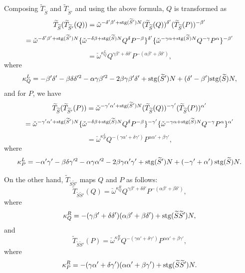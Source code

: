 \documentclass[12pt]{iopart}
\begin{document}
Composing \(\widetilde T_{\widetilde S}\) and \(\widetilde T_{\widetilde S'}\) and using the above formula,
\(Q\) is transformed as
\[
\widetilde T_{\widetilde S}(\widetilde T_{\widetilde S'}(Q))
=\check\omega^{-\delta'\beta'+{\rm stg}(\widetilde S')N}(\widetilde T_{\widetilde S}(Q))^{\delta'}(\widetilde T_{\widetilde S}(P))^{-\beta'}
\]
\[
=\check\omega^{-\delta'\beta'+{\rm stg}(\widetilde S')N}
\{\check\omega^{-\delta\beta+{\rm stg}(\widetilde S)N}
                        Q^\delta P^{-\beta}\}^{\delta'}
\{\check\omega^{-\gamma\alpha+{\rm stg}(\widetilde S)N}
                        Q^{-\gamma}P^\alpha\}^{-\beta'}
\]
\begin{equation}
=
\check\omega^{\kappa^L_Q}Q^{\gamma\beta'+\delta\delta'}P^{-(\alpha\beta'+\beta\delta')},
\end{equation}
where
\begin{equation}
\kappa^L_Q
=-\beta'\delta'-\beta\delta\delta'^2-\alpha\gamma\beta'^2-2\beta\gamma\beta'\delta'
+{\rm stg}(\widetilde S')N
+(\delta'-\beta'){\rm stg}(\widetilde S)N,
\end{equation}
and for \(P\), we have
\[
\widetilde T_{\widetilde S}(\widetilde T_{\widetilde S'}(P))
=\check\omega^{-\gamma'\alpha'+{\rm stg}(\widetilde S')N}(\widetilde T_{\widetilde S}(Q))^{-\gamma'}(\widetilde T_{\widetilde S}(P))^{\alpha'}
\]
\[
=\check\omega^{-\gamma'\alpha'+{\rm stg}(\widetilde S')N}
\{\check\omega^{-\delta\beta+{\rm stg}(\widetilde S)N}
                        Q^\delta P^{-\beta}\}^{-\gamma'}
\{
\check\omega^{-\gamma\alpha+{\rm stg}(\widetilde S)N}
                        Q^{-\gamma}P^\alpha\}^{\alpha'}
\]
\begin{equation}
=
\check\omega^{\kappa^L_P}Q^{-(\gamma\alpha'+\delta\gamma')}P^{\alpha\alpha'+\beta\gamma'},
\end{equation}
where
\begin{equation}
\kappa^L_P
=-\alpha'\gamma'-\beta\delta\gamma'^2-\alpha\gamma\alpha'^2-2\beta\gamma\alpha'\gamma'
+{\rm stg}(\widetilde S')N
+(-\gamma'+\alpha')\:{\rm stg}(\widetilde S)N.
\end{equation}

On the other hand,
\(\widetilde T_{\widetilde S\widetilde S'}\) maps \(Q\) and \(P\) as follows:
\begin{equation}
\widetilde T_{\widetilde S\widetilde S'}(Q)
=
\check\omega^{\kappa^R_Q}Q^{\gamma\beta'+\delta\delta'}P^{-(\alpha\beta'+\beta\delta')},
\end{equation}
where
\begin{equation}
\kappa^R_Q=-(\gamma\beta'+\delta\delta')(\alpha\beta'+\beta\delta')+{\rm stg}(\widetilde S\widetilde S')N,
\end{equation}
and
\begin{equation}
\widetilde T_{\widetilde S\widetilde S'}(P)
=
\check\omega^{\kappa^R_P}Q^{-(\gamma\alpha'+\delta\gamma')}P^{\alpha\alpha'+\beta\gamma'},
\end{equation}
where
\begin{equation}
\kappa^R_P=
-(\gamma\alpha'+\delta\gamma')(\alpha\alpha'+\beta\gamma')
+{\rm stg}(\widetilde S\widetilde S')N.
\end{equation}
\end{document}
